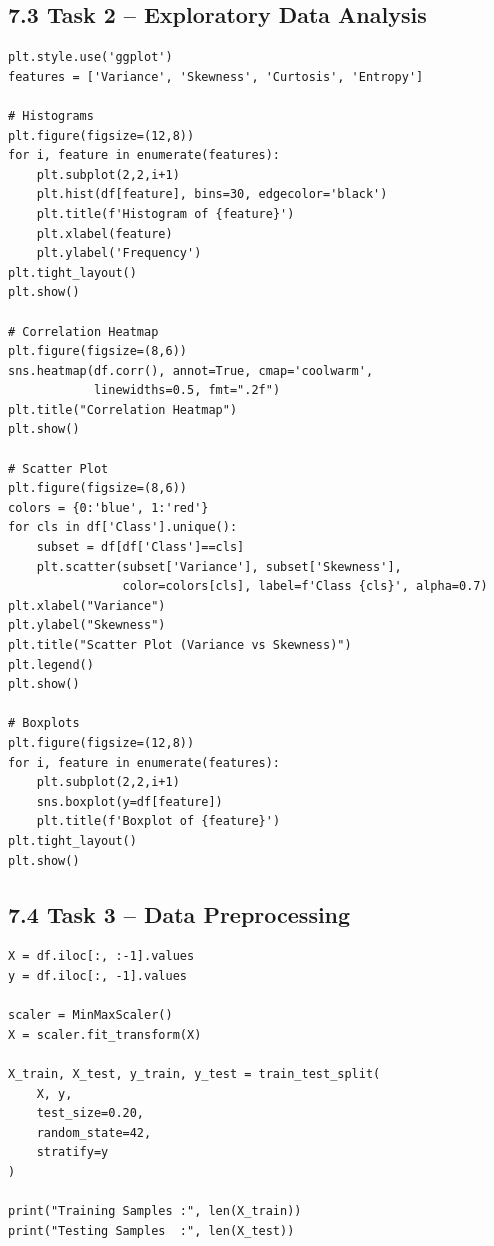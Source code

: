 \documentclass[11pt]{article}
\begin{document}
\subsection*{7.3 Task 2 -- Exploratory Data Analysis}
\begin{lstlisting}
plt.style.use('ggplot')
features = ['Variance', 'Skewness', 'Curtosis', 'Entropy']

# Histograms
plt.figure(figsize=(12,8))
for i, feature in enumerate(features):
    plt.subplot(2,2,i+1)
    plt.hist(df[feature], bins=30, edgecolor='black')
    plt.title(f'Histogram of {feature}')
    plt.xlabel(feature)
    plt.ylabel('Frequency')
plt.tight_layout()
plt.show()

# Correlation Heatmap
plt.figure(figsize=(8,6))
sns.heatmap(df.corr(), annot=True, cmap='coolwarm',
            linewidths=0.5, fmt=".2f")
plt.title("Correlation Heatmap")
plt.show()

# Scatter Plot
plt.figure(figsize=(8,6))
colors = {0:'blue', 1:'red'}
for cls in df['Class'].unique():
    subset = df[df['Class']==cls]
    plt.scatter(subset['Variance'], subset['Skewness'],
                color=colors[cls], label=f'Class {cls}', alpha=0.7)
plt.xlabel("Variance")
plt.ylabel("Skewness")
plt.title("Scatter Plot (Variance vs Skewness)")
plt.legend()
plt.show()

# Boxplots
plt.figure(figsize=(12,8))
for i, feature in enumerate(features):
    plt.subplot(2,2,i+1)
    sns.boxplot(y=df[feature])
    plt.title(f'Boxplot of {feature}')
plt.tight_layout()
plt.show()
\end{lstlisting}

\subsection*{7.4 Task 3 -- Data Preprocessing}
\begin{lstlisting}
X = df.iloc[:, :-1].values
y = df.iloc[:, -1].values

scaler = MinMaxScaler()
X = scaler.fit_transform(X)

X_train, X_test, y_train, y_test = train_test_split(
    X, y,
    test_size=0.20,
    random_state=42,
    stratify=y
)

print("Training Samples :", len(X_train))
print("Testing Samples  :", len(X_test))
\end{lstlisting}
\end{document}
